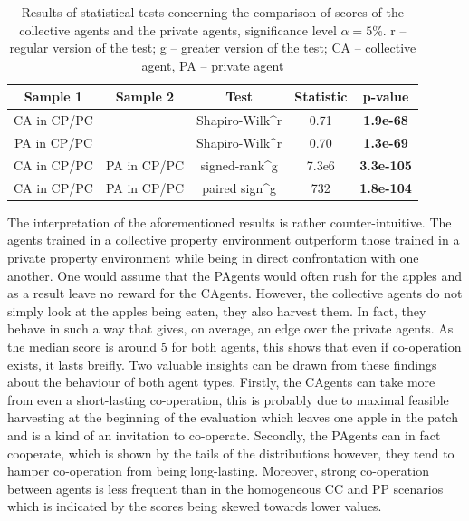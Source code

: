 \documentclass[preprint,12pt,authoryear]{elsarticle}
\begin{document}
\begin{table}[h!]
\begin{tabularx}{\textwidth}{ccccc}
\toprule
Sample 1             & Sample 2             & Test                        & Statistic & p-value   \\ \midrule
CA in CP/PC &                      & Shapiro-Wilk^r            & 0.71      & \textbf{1.9e-68}    \\
PA in CP/PC &                      & Shapiro-Wilk^r            & 0.70      & \textbf{1.3e-69}    \\
CA in CP/PC & PA in CP/PC & signed-rank^g    & 7.3e6     &  \textbf{3.3e-105}  \\
CA in CP/PC & PA in CP/PC & paired sign^g  & 732     &  \textbf{1.8e-104}  \\ \bottomrule
\end{tabularx}
\caption{Results of statistical tests concerning the comparison of scores of the collective agents and the private agents, significance level $\alpha=5\%$. r -- regular version of the test; g -- greater version of the test; CA -- collective agent, PA -- private agent}
\label{table:score-hetero}
\end{table}


The interpretation of the aforementioned results is rather counter-intuitive. The agents trained in a collective property environment outperform those trained in a private property environment while being in direct confrontation with one another. One would assume that the PAgents would often rush for the apples and as a result leave no reward for the CAgents. However, the collective agents do not simply look at the apples being eaten, they also harvest them. In fact, they behave in such a way that gives, on average, an edge over the private agents. As the median score is around $5$ for both agents, this shows that even if co-operation exists, it lasts breifly. Two valuable insights can be drawn from these findings about the behaviour of both agent types. Firstly, the CAgents can take more from even a short-lasting co-operation, this is probably due to maximal feasible harvesting at the beginning of the evaluation which leaves one apple in the patch and is a kind of an invitation to co-operate. Secondly, the PAgents can in fact cooperate, which is shown by the tails of the distributions however, they tend to hamper co-operation from being long-lasting. Moreover, strong co-operation between agents is less frequent than in the homogeneous CC and PP scenarios which is indicated by the scores being skewed towards lower values.
\end{document}
